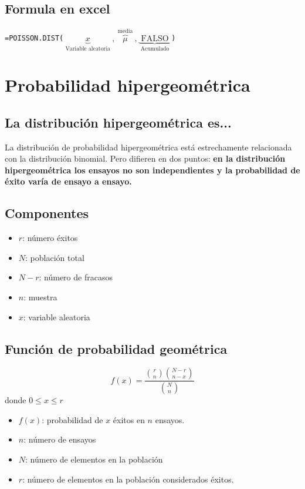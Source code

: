 \documentclass{article}
\begin{document}
\subsection{Formula en excel}
\begin{center}
    \verb|=POISSON.DIST(|$\underbrace{x}_{\text{ Variable aleatoria }},\overbrace{\mu}^{\text{ media }},\underbrace{\text{ FALSO }}_{\text{ Acumulado }}    $\verb|)| \newline 
    
\end{center}



\hrulefill
\section{Probabilidad hipergeométrica}
\subsection{La distribución hipergeométrica es...}
La distribución de probabilidad hipergeométrica está estrechamente relacionada con la distribución binomial. Pero difieren en dos puntos: \textbf{en la distribución hipergeométrica los ensayos no son independientes y la probabilidad de éxito varía de ensayo a ensayo.}

\subsection{Componentes }
\begin{itemize}
    \item $r$: número éxitos 
    \item $N$: población total 
    \item $N-r$: número de fracasos 
    \item $n$: muestra 
    \item $x$: variable aleatoria 
\end{itemize}


\subsection{Función de probabilidad geométrica}
\[
  f(x) = \frac{\binom{r}{n}\binom{N-r}{n-x}}{\binom{N}{n}} 
\] donde $0\leq x \leq r$ 
\begin{itemize}
    \item $f(x)$: probabilidad de $x$ éxitos en $n$ ensayos.
    \item $n$: número de ensayos 
    \item $N$: número de elementos en la población 
    \item $r$: número de elementos en la población considerados éxitos. 
\end{itemize}
\end{document}
